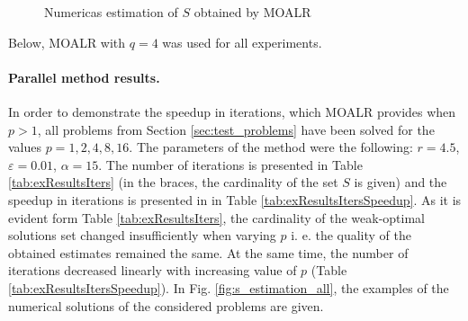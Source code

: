 \documentclass{llncs}
\begin{document}
\begin{figure}[ht]
    \centering
    \caption{Numericas estimation of \(S\) obtained by MOALR}
    \label{fig:fonseca_slater}
\end{figure}

Below, MOALR with \(q=4\) was used for all experiments.

\paragraph{Parallel method results.} In order to demonstrate the speedup in iterations, which
MOALR provides when \(p > 1\), all problems from Section \ref{sec:test_problems} have been
solved for the values \(p=1,2,4,8,16\). The parameters of the method were the following:
\(r=4.5\), \(\varepsilon=0.01\), \(\alpha=15\). The number of iterations is presented in Table \ref{tab:exResultsIters}
(in the braces, the cardinality of the set \(S\) is given) and the speedup in iterations is presented
in in Table \ref{tab:exResultsItersSpeedup}. As it is evident form Table
\ref{tab:exResultsIters}, the cardinality of the weak-optimal solutions set changed insufficiently when varying \(p\)
i. e. the quality of the obtained estimates remained the same. At the same time, the number of
iterations decreased linearly with increasing value of \(p\) (Table
\ref{tab:exResultsItersSpeedup}). In Fig. \ref{fig:s_estimation_all}, the examples of the
numerical solutions of the considered problems are given.
\end{document}

